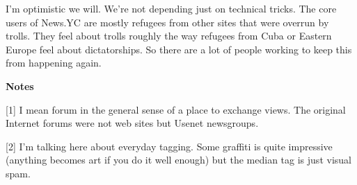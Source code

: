 I'm optimistic we will.  We're not depending just on technical
tricks.  The core users of News.YC are mostly refugees from other
sites that were overrun by trolls.  They feel about trolls roughly
the way refugees from Cuba or Eastern Europe feel about dictatorships.
So there are a lot of people working to keep this from happening
again.






\textbf{Notes}

[1]
I mean forum in the general sense of a place to exchange views.
The original Internet forums were not web sites but Usenet newsgroups.

[2]
I'm talking here about everyday tagging.  Some graffiti is
quite impressive (anything becomes art if you do it well enough)
but the median tag is just visual spam.


